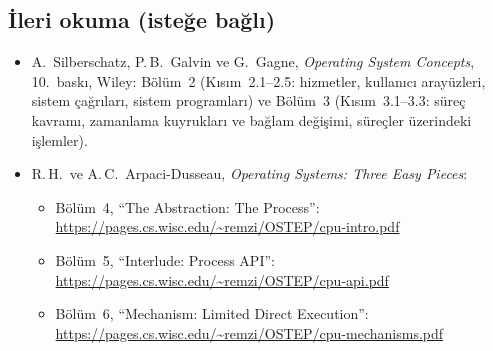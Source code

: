 \subsection*{İleri okuma (isteğe bağlı)}
\begin{itemize}
  \item A.\ Silberschatz, P.\,B.\ Galvin ve G.\ Gagne, \emph{Operating System Concepts}, 10.\ baskı, Wiley: Bölüm~2 (Kısım~2.1--2.5: hizmetler, kullanıcı arayüzleri, sistem çağrıları, sistem programları) ve Bölüm~3 (Kısım~3.1--3.3: süreç kavramı, zamanlama kuyrukları ve bağlam değişimi, süreçler üzerindeki işlemler).
  \item R.\,H.\ ve A.\,C.\ Arpaci-Dusseau, \emph{Operating Systems: Three Easy Pieces}:
    \begin{itemize}
      \item Bölüm~4, ``The Abstraction: The Process'': \url{https://pages.cs.wisc.edu/~remzi/OSTEP/cpu-intro.pdf}
      \item Bölüm~5, ``Interlude: Process API'': \url{https://pages.cs.wisc.edu/~remzi/OSTEP/cpu-api.pdf}
      \item Bölüm~6, ``Mechanism: Limited Direct Execution'': \url{https://pages.cs.wisc.edu/~remzi/OSTEP/cpu-mechanisms.pdf}
    \end{itemize}
\end{itemize}
